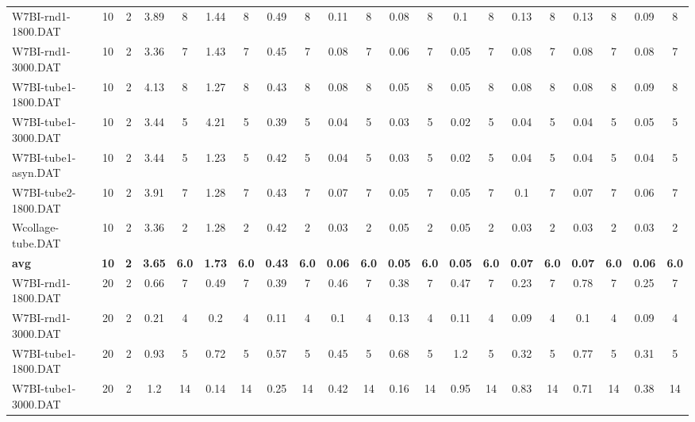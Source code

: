 \begin{sidewaystable}[!ht]
{\begin{tabular}{lcccccccccccccccccccc}
W7BI-rnd1-1800.DAT & 10 & 2 & 3.89 & 8 & 1.44 & 8 & 0.49 & 8 & 0.11 & 8 &  \textcolor{blue2}{0.08} & 8 & 0.1 & 8 & 0.13 & 8 & 0.13 & 8 & 0.09 & 8 \\
W7BI-rnd1-3000.DAT & 10 & 2 & 3.36 & 7 & 1.43 & 7 & 0.45 & 7 & 0.08 & 7 & 0.06 & 7 &  \textcolor{blue2}{0.05} & 7 & 0.08 & 7 & 0.08 & 7 & 0.08 & 7 \\
W7BI-tube1-1800.DAT & 10 & 2 & 4.13 & 8 & 1.27 & 8 & 0.43 & 8 & 0.08 & 8 &  \textcolor{blue2}{0.05} & 8 &  \textcolor{blue2}{0.05} & 8 & 0.08 & 8 & 0.08 & 8 & 0.09 & 8 \\
W7BI-tube1-3000.DAT & 10 & 2 & 3.44 & 5 & 4.21 & 5 & 0.39 & 5 & 0.04 & 5 & 0.03 & 5 &  \textcolor{blue2}{0.02} & 5 & 0.04 & 5 & 0.04 & 5 & 0.05 & 5 \\
W7BI-tube1-asyn.DAT & 10 & 2 & 3.44 & 5 & 1.23 & 5 & 0.42 & 5 & 0.04 & 5 & 0.03 & 5 &  \textcolor{blue2}{0.02} & 5 & 0.04 & 5 & 0.04 & 5 & 0.04 & 5 \\
W7BI-tube2-1800.DAT & 10 & 2 & 3.91 & 7 & 1.28 & 7 & 0.43 & 7 & 0.07 & 7 &  \textcolor{blue2}{0.05} & 7 &  \textcolor{blue2}{0.05} & 7 & 0.1 & 7 & 0.07 & 7 & 0.06 & 7 \\
Wcollage-tube.DAT & 10 & 2 & 3.36 & 2 & 1.28 & 2 & 0.42 & 2 &  \textcolor{blue2}{0.03} & 2 & 0.05 & 2 & 0.05 & 2 &  \textcolor{blue2}{0.03} & 2 &  \textcolor{blue2}{0.03} & 2 &  \textcolor{blue2}{0.03} & 2 \\
\cline{1-21} \textbf{avg} & \textbf{10} & \textbf{2} & \textbf{3.65} & \textbf{6.0} & \textbf{1.73} & \textbf{6.0} & \textbf{0.43} & \textbf{6.0} & \textbf{0.06} & \textbf{6.0} & \textbf{0.05} & \textbf{6.0} & \textbf{0.05} & \textbf{6.0} & \textbf{0.07} & \textbf{6.0} & \textbf{0.07} & \textbf{6.0} & \textbf{0.06} & \textbf{6.0} \\ \cline{1-21}
W7BI-rnd1-1800.DAT & 20 & 2 & 0.66 & 7 & 0.49 & 7 & 0.39 & 7 & 0.46 & 7 & 0.38 & 7 & 0.47 & 7 &  \textcolor{blue2}{0.23} & 7 & 0.78 & 7 & 0.25 & 7 \\
W7BI-rnd1-3000.DAT & 20 & 2 & 0.21 & 4 & 0.2 & 4 & 0.11 & 4 & 0.1 & 4 & 0.13 & 4 & 0.11 & 4 &  \textcolor{blue2}{0.09} & 4 & 0.1 & 4 &  \textcolor{blue2}{0.09} & 4 \\
W7BI-tube1-1800.DAT & 20 & 2 & 0.93 & 5 & 0.72 & 5 & 0.57 & 5 & 0.45 & 5 & 0.68 & 5 & 1.2 & 5 & 0.32 & 5 & 0.77 & 5 &  \textcolor{blue2}{0.31} & 5 \\
W7BI-tube1-3000.DAT & 20 & 2 & 1.2 & 14 &  \textcolor{blue2}{0.14} & 14 & 0.25 & 14 & 0.42 & 14 & 0.16 & 14 & 0.95 & 14 & 0.83 & 14 & 0.71 & 14 & 0.38 & 14 \\

\end{tabular}}
\end{sidewaystable}

